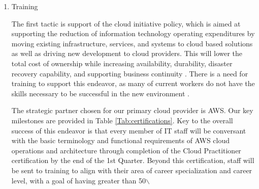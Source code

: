 \documentclass[stu]{apa7}
\begin{document}
\begin{enumerate}
\item Training
\label{sec:org8c620bb}

The first tactic is support of the cloud initiative policy, which is aimed at supporting the reduction of information technology operating expenditures by moving existing infrastructure, services, and systems to cloud based solutions as well as driving new development to cloud providers. This will lower the total cost of ownership while increasing availability, durability, disaster recovery capability, and supporting business continuity \citep{chiTotalCostOwnership2021}. There is a need for training to support this endeavor, as many of current workers do not have the skills necessary to be successful in the new environment \citep{kenellyReasonsMostCompanies2019,sayeghCloudTalentDrought}.

The strategic partner chosen for our primary cloud provider is AWS. Our key milestones are provided in Table \ref{Tab:certifications}. Key to the overall success of this endeavor is that every member of IT staff will be conversant with the basic terminology and functional requirements of AWS cloud operations and architecture through completion of the Cloud Practitioner certification by the end of the 1st Quarter. Beyond this certification, staff will be sent to training to align with their area of career specialization and career level, with a goal of having greater than 50$\backslash$%



\end{enumerate}
\end{document}
